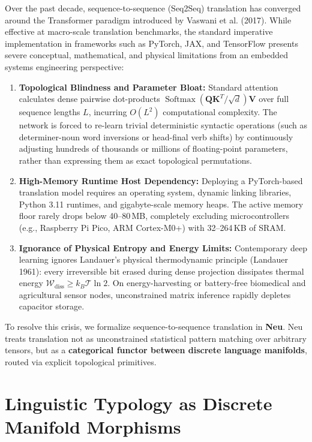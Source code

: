 \documentclass[11pt]{article}
\begin{document}
Over the past decade, sequence-to-sequence (Seq2Seq) translation has converged around the Transformer paradigm introduced by Vaswani et al. (2017). While effective at macro-scale translation benchmarks, the standard imperative implementation in frameworks such as PyTorch, JAX, and TensorFlow presents severe conceptual, mathematical, and physical limitations from an embedded systems engineering perspective:
\begin{enumerate}
    \item \textbf{Topological Blindness and Parameter Bloat:} Standard attention calculates dense pairwise dot-products $\operatorname{Softmax}(\mathbf{Q}\mathbf{K}^T/\sqrt{d})\mathbf{V}$ over full sequence lengths $L$, incurring $O(L^2)$ computational complexity. The network is forced to re-learn trivial deterministic syntactic operations (such as determiner-noun word inversions or head-final verb shifts) by continuously adjusting hundreds of thousands or millions of floating-point parameters, rather than expressing them as exact topological permutations.
    \item \textbf{High-Memory Runtime Host Dependency:} Deploying a PyTorch-based translation model requires an operating system, dynamic linking libraries, Python 3.11 runtimes, and gigabyte-scale memory heaps. The active memory floor rarely drops below 40--80\,MB, completely excluding microcontrollers (e.g., Raspberry Pi Pico, ARM Cortex-M0+) with 32--264\,KB of SRAM.
    \item \textbf{Ignorance of Physical Entropy and Energy Limits:} Contemporary deep learning ignores Landauer's physical thermodynamic principle (Landauer 1961): every irreversible bit erased during dense projection dissipates thermal energy $\mathcal{W}_{\text{diss}} \ge k_B \mathcal{T} \ln 2$. On energy-harvesting or battery-free biomedical and agricultural sensor nodes, unconstrained matrix inference rapidly depletes capacitor storage.
\end{enumerate}

To resolve this crisis, we formalize sequence-to-sequence translation in \textbf{Neu}. Neu treats translation not as unconstrained statistical pattern matching over arbitrary tensors, but as a \textbf{categorical functor between discrete language manifolds}, routed via explicit topological primitives.

\section{Linguistic Typology as Discrete Manifold Morphisms}
\end{document}
